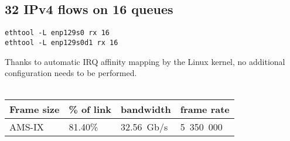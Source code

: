 
\subsection{32 IPv4 flows on 16 queues}
\begin{lstlisting}
ethtool -L enp129s0 rx 16
ethtool -L enp129s0d1 rx 16
\end{lstlisting}
Thanks to automatic IRQ affinity mapping by the Linux kernel, no additional configuration needs to be performed.
\\
\\
\begin{tabular}{ | l | l | l | l | }
\hline
Frame size & \% of link & bandwidth & frame rate \\
\hline
AMS-IX & 81.40\% & 32.56~Gb/s & 5~350~000 \\
\hline
\end{tabular}
\\
\\
